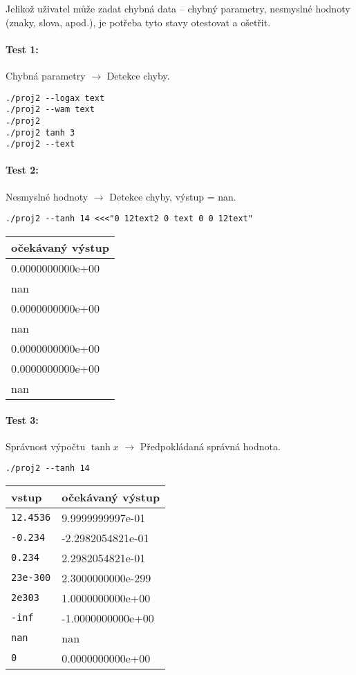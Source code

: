 \documentclass[12pt,a4paper,titlepage,final]{article}
\begin{document}
Jelikož uživatel může zadat chybná data -- chybný parametry, nesmyslné
hodnoty (znaky, slova, apod.), je potřeba tyto stavy
otestovat a ošetřit.

\paragraph{Test 1:} Chybná parametry $\longrightarrow$ Detekce chyby.
\begin{verbatim}
./proj2 --logax text 
./proj2 --wam text 
./proj2 
./proj2 tanh 3 
./proj2 --text
\end{verbatim} 

\paragraph{Test 2:} Nesmyslné hodnoty $\longrightarrow$ Detekce chyby, výstup = nan.
\begin{verbatim}
./proj2 --tanh 14 <<<"0 12text2 0 text 0 0 12text"
\end{verbatim} 
\vspace{1em}\begin{tabular}{l} %
očekávaný výstup \\
\hline
0.0000000000e+00 \\
nan \\
0.0000000000e+00 \\
nan\\
0.0000000000e+00 \\
0.0000000000e+00 \\
nan \\
\end{tabular}

\paragraph{Test 3:} Správnost výpočtu $\tanh{x}$ $\longrightarrow$ Předpokládaná správná hodnota.
\begin{verbatim}
./proj2 --tanh 14
\end{verbatim}
\vspace{1em}\begin{tabular}{ll} %
vstup & očekávaný výstup \\
\hline
\verb|12.4536| & 9.9999999997e-01 \\
\verb|-0.234| & -2.2982054821e-01 \\
\verb|0.234| &   2.2982054821e-01 \\
\verb|23e-300| & 2.3000000000e-299\\
\verb|2e303| & 1.0000000000e+00 \\
\verb|-inf| & -1.0000000000e+00 \\
\verb|nan| & nan \\
\verb|0| & 0.0000000000e+00 \\
\end{tabular}
\end{document}
